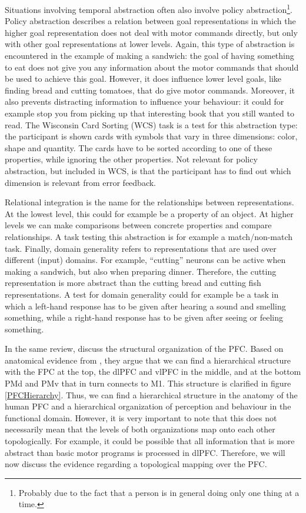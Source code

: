 \documentclass[10pt,a4paper]{report}
\begin{document}
Situations involving temporal abstraction often also involve policy abstraction\footnote{Probably due to the fact that a person is in general doing only one thing at a time.}. Policy abstraction describes a relation between goal representations in which the higher goal representation does not deal with motor commands directly, but only with other goal representations at lower levels. Again, this type of abstraction is encountered in the example of making a sandwich: the goal of having something to eat does not give you any information about the motor commands that should be used to achieve this goal. However, it does influence lower level goals, like finding bread and cutting tomatoes, that do give motor commands. Moreover, it also prevents distracting information to influence your behaviour: it could for example stop you from picking up that interesting book that you still wanted to read. The Wisconsin Card Sorting (WCS) task is a test for this abstraction type: the participant is shown cards with symbols that vary in three dimensions: color, shape and quantity. The cards have to be sorted according to one of these properties, while ignoring the other properties. Not relevant for policy abstraction, but included in WCS, is that the participant has to find out which dimension is relevant from error feedback.

Relational integration is the name for the relationships between representations. At the lowest level, this could for example be a property of an object. At higher levels we can make comparisons between concrete properties and compare relationships. A task testing this abstraction is for example a match/non-match task. Finally, domain generality refers to representations that are used over different (input) domains. For example, ``cutting'' neurons can be active when making a sandwich, but also when preparing dinner. Therefore, the cutting representation is more abstract than the cutting bread and cutting fish representations. A test for domain generality could for example be a task in which a left-hand response has to be given after hearing a sound and smelling something, while a right-hand response has to be given after seeing or feeling something.

In the same review, \citet{Badre2009} discuss the structural organization of the PFC. Based on anatomical evidence from \citet{Petrides2007}, they argue that we can find a hierarchical structure with the FPC at the top, the dlPFC and vlPFC in the middle, and at the bottom PMd and PMv that in turn connects to M1. This structure is clarified in figure \ref{PFCHierarchy}. Thus, we can find a hierarchical structure in the anatomy of the human PFC and a hierarchical organization of perception and behaviour in the functional domain. However, it is very important to note that this does not necessarily mean that the levels of both organizations map onto each other topologically. For example, it could be possible that all information that is more abstract than basic motor programs is processed in dlPFC. Therefore, we will now discuss the evidence regarding a topological mapping over the PFC.
\end{document}
